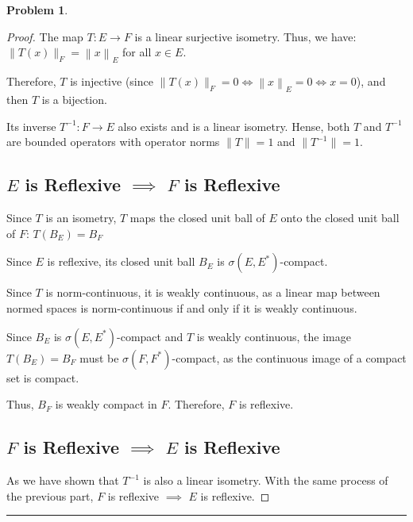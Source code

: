 \documentclass{article}
\newcommand{\norm}[1]{\left\|#1\right\|}
\newtheorem{problem}{Problem}
\begin{document}
\begin{problem}
\end{problem}
\begin{proof}


The map $T: E \to F$ is a linear surjective isometry. Thus, we have: $\|T(x)\|_F = \norm{x}_E$ for all $x \in E$.

Therefore, $T$ is injective (since $\|T(x)\|_F = 0 \iff \norm{x}_E = 0 \iff x=0$), and then $T$ is a bijection. 

Its inverse $T^{-1}: F \to E$ also exists and is a linear isometry. Hense, both $T$ and $T^{-1}$ are bounded operators with operator norms $\|T\| = 1$ and $\|T^{-1}\| = 1$.

\subsection*{$E$ is Reflexive $\implies$ $F$ is Reflexive}

Since $T$ is an isometry, $T$ maps the closed unit ball of $E$ onto the closed unit ball of $F$:
$T(B_E) = B_F$

Since $E$ is reflexive, its closed unit ball $B_E$ is $\sigma(E, E^*)$-compact.

Since $T$ is norm-continuous, it is weakly continuous, as a linear map between normed spaces is norm-continuous if and only if it is weakly continuous.

Since $B_E$ is $\sigma(E, E^*)$-compact and $T$ is weakly continuous, the image $T(B_E) = B_F$ must be $\sigma(F, F^*)$-compact, as the continuous image of a compact set is compact. 

Thus, $B_F$ is weakly compact in $F$. Therefore, $F$ is reflexive.

\subsection*{$F$ is Reflexive $\implies$ $E$ is Reflexive}

As we have shown that $T^{-1}$ is also a linear isometry. With the same process of the previous part, $F$ is reflexive $\implies$ $E$ is reflexive.

\end{proof}


\hrule
\vspace{0.5em}
\end{document}
